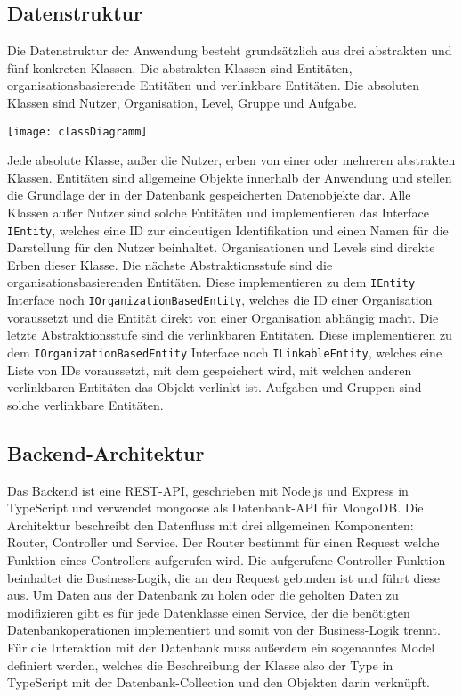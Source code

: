 \subsection{Datenstruktur}
Die Datenstruktur der Anwendung besteht grundsätzlich aus drei abstrakten und fünf konkreten Klassen. Die abstrakten Klassen sind Entitäten, organisationsbasierende Entitäten und verlinkbare Entitäten. Die absoluten Klassen sind Nutzer, Organisation, Level, Gruppe und Aufgabe.

\vspace{20pt}
\begin{center}
    \begin{minipage}{1\linewidth}
        \texttt{[image: classDiagramm]}
    \end{minipage}
\end{center}
\vspace{20pt}

Jede absolute Klasse, außer die Nutzer, erben von einer oder mehreren abstrakten Klassen. Entitäten sind allgemeine Objekte innerhalb der Anwendung und stellen die Grundlage der in der Datenbank gespeicherten Datenobjekte dar. Alle Klassen außer Nutzer sind solche Entitäten und implementieren das Interface \verb|IEntity|, welches eine ID zur eindeutigen Identifikation und einen Namen für die Darstellung für den Nutzer beinhaltet. Organisationen und Levels sind direkte Erben dieser Klasse. Die nächste Abstraktionsstufe sind die organisationsbasierenden Entitäten. Diese implementieren zu dem \verb|IEntity| Interface noch \verb|IOrganizationBasedEntity|, welches die ID einer Organisation voraussetzt und die Entität direkt von einer Organisation abhängig macht. Die letzte Abstraktionsstufe sind die verlinkbaren Entitäten. Diese implementieren zu dem \verb|IOrganizationBasedEntity| Interface noch \verb|ILinkableEntity|, welches eine Liste von IDs voraussetzt, mit dem gespeichert wird, mit welchen anderen verlinkbaren Entitäten das Objekt verlinkt ist. Aufgaben und Gruppen sind solche verlinkbare Entitäten.

\subsection{Backend-Architektur}
Das Backend ist eine REST-API, geschrieben mit Node.js und Express in TypeScript und verwendet mongoose als Datenbank-API für MongoDB. Die Architektur beschreibt den Datenfluss mit drei allgemeinen Komponenten: Router, Controller und Service.
Der Router bestimmt für einen Request welche Funktion eines Controllers aufgerufen wird. Die aufgerufene Controller-Funktion beinhaltet die Business-Logik, die an den Request gebunden ist und führt diese aus. Um Daten aus der Datenbank zu holen oder die geholten Daten zu modifizieren gibt es für jede Datenklasse einen Service, der die benötigten Datenbankoperationen implementiert und somit von der Business-Logik trennt. Für die Interaktion mit der Datenbank muss außerdem ein sogenanntes Model definiert werden, welches die Beschreibung der Klasse also der Type in TypeScript mit der Datenbank-Collection und den Objekten darin verknüpft.

